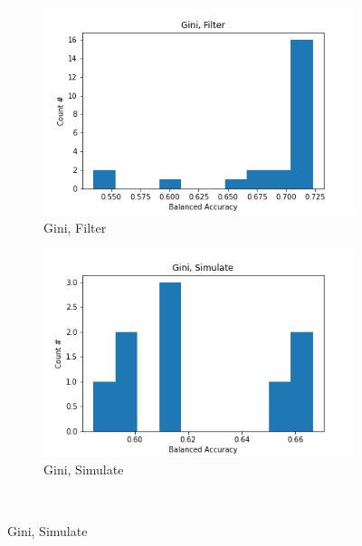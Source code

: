 \documentclass{article}
\begin{document}
\begin{figure}[H]
  \centering

  \begin{subfigure}[t]{.45\linewidth}
    \centering\includegraphics[width=1\linewidth]{Fig/Gini, Filter.png}
    \caption{Gini, Filter}
  \end{subfigure}
  \begin{subfigure}[t]{.45\linewidth}
    \centering\includegraphics[width=1\linewidth]{Fig/Gini, Simulate.png}
    \caption{Gini, Simulate}
  \end{subfigure}\\


\end{figure}
\end{document}
